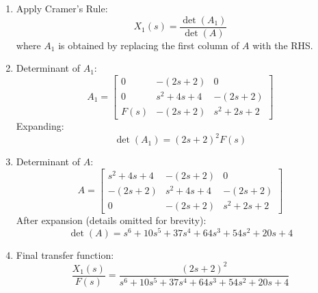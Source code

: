 \documentclass[11pt]{article}
\begin{document}
\begin{enumerate}[label=(\alph*), itemindent=*, leftmargin=*, nolistsep]
    \item Apply Cramer’s Rule:
    \[
    X_1(s) = \frac{\det(A_1)}{\det(A)}
    \]
    where $A_1$ is obtained by replacing the first column of $A$ with the RHS.
    
    \item Determinant of $A_1$:
    \[
    A_1 =
    \begin{bmatrix}
    0 & -(2s+2) & 0 \\
    0 & s^2+4s+4 & -(2s+2) \\
    F(s) & -(2s+2) & s^2+2s+2
    \end{bmatrix}
    \]
    Expanding:
    \[
    \det(A_1) = (2s+2)^2F(s)
    \]
    
    \item Determinant of $A$:
    \[
    A =
    \begin{bmatrix}
    s^2+4s+4 & -(2s+2) & 0 \\
    -(2s+2) & s^2+4s+4 & -(2s+2) \\
    0 & -(2s+2) & s^2+2s+2
    \end{bmatrix}
    \]
    After expansion (details omitted for brevity):
    \[
    \det(A) = s^6 + 10s^5 + 37s^4 + 64s^3 + 54s^2 + 20s + 4
    \]
    \item Final transfer function:
    \[
    \frac{X_1(s)}{F(s)} = \frac{(2s+2)^2}{s^6 + 10s^5 + 37s^4 + 64s^3 + 54s^2 + 20s + 4}
    \]
\end{enumerate}

\end{document}
